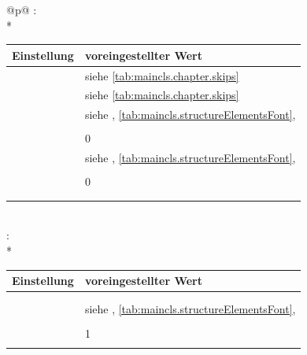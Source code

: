 \begin{longtable}{@{}p{\columnwidth}@{}}
    : \\*
    \begin{tabularx}{\linewidth}{ll}
    \toprule
    Einstellung & voreingestellter Wert \\
    \midrule
    \PValue{afterskip}   & siehe \autoref{tab:maincls.chapter.skips} \\
    \PValue{beforeskip}  & siehe \autoref{tab:maincls.chapter.skips} \\
    \PValue{font}        & siehe  \DescRef{maincls.fontelement.chapter},
                           \autoref{tab:maincls.structureElementsFont},
                           \autopageref{tab:maincls.structureElementsFont} \\
    \PValue{innerskip}   & \PValue{0.5\Length{baselineskip}} \\
    \PValue{level}       & 0 \\
    \PValue{prefixfont}  & siehe
                           \DescRef{maincls.fontelement.chapterprefix},
                           \autoref{tab:maincls.structureElementsFont},
                           \autopageref{tab:maincls.structureElementsFont} \\
    \PValue{tocindent}   & \PValue{0pt} \\
    \PValue{toclevel}    & 0 \\
    \PValue{tocnumwidth} & \PValue{1.5em} \\
    \PValue{tocstyle}    & \PValue{chapter} \\
    \bottomrule
    \end{tabularx} \\
    \addlinespace[\normalbaselineskip]
    : \\*
    \begin{tabularx}{\linewidth}{ll}
    \toprule
    Einstellung & voreingestellter Wert \\
    \midrule
    \PValue{afterskip}   & \PValue{2.3ex plus .2ex} \\
    \PValue{beforeskip}  & \PValue{-3.5ex plus -1ex minus -.2ex} \\
    \PValue{font}        & siehe  \DescRef{maincls.fontelement.section},
                           \autoref{tab:maincls.structureElementsFont},
                           \autopageref{tab:maincls.structureElementsFont} \\
    \PValue{indent}      & \PValue{0pt} \\
    \PValue{level}       & 1 \\
    \PValue{tocindent}   & \PValue{1.5em}\\

\end{tabularx}
\end{longtable}
